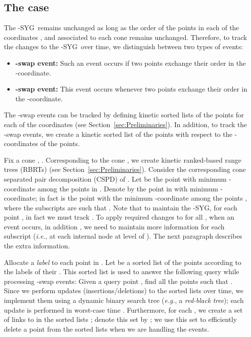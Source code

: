 \documentclass[preprint,12pt]{elsarticle}
\def\1syg{\mbox{-SYG}}
\newcommand{\ie}{\emph{i.e.}}
\newcommand{\eg}{\emph{e.g.}}
\begin{document}
\subsection{The case }\label{sec:KDSfor1SYG}


The \1syg~remains unchanged as long as the order of the points in each of the coordinates , and  associated to each cone  remains unchanged. Therefore, to track the changes to the \1syg~over time, we distinguish between two types of events:

\begin{itemize}
\item \textbf{-swap event:} Such an event occurs if two points exchange their order in the -coordinate. 
\item \textbf{-swap event:} This event occurs whenever two points exchange their order in the -coordinate. 
\end{itemize}

The -swap events can be tracked by defining  kinetic sorted lists  of the points for each of the coordinates  (see Section~\ref{sec:Preliminaries}). In addition, to track the -swap events, we create a kinetic sorted list  of the points with respect to the -coordinates of the points.

Fix a cone , . Corresponding to the cone , we create kinetic ranked-based range trees (RBRTs)  (see Section~\ref{sec:Preliminaries}). Consider the corresponding cone separated pair decomposition (CSPD)  of . Let  be the point with minimum -coordinate among the points in . Denote by  the point in  with minimum -coordinate; in fact  is the point with the minimum -coordinate among the points , where the subscripts  are such that . Note that to maintain the \1syg, for each point , in fact we must track .
To apply required changes to  for all , when an event occurs, in addition , we need to maintain more information for each subscript  (\ie, at each internal node  at level  of ). The next paragraph describes the extra information.

Allocate a \textit{label} to each point in . Let  be a sorted list of the points  according to the labels of their . This sorted list is used to answer the following query while processing -swap events: Given a query point , find all the points  such that . Since we perform  updates (insertions/deletions) to the sorted lists  over time, we implement them using a dynamic binary search tree (\eg, a \textit{red-black tree}); each update is performed in worst-case time . Furthermore, for each , we create a set of links to  in the sorted lists ; denote this set by ; we use this set to efficiently delete a point  from the sorted lists  when we are handling the events.
\end{document}
